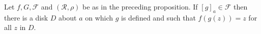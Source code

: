 Let $f, G, \mathcal{F}$ and $(\mathcal{R}, \rho)$ be as in the preceding proposition. If $[g]_a \in \mathcal{F}$ then there is a disk $D$ about $a$ on which $g$ is defined and such that $f(g(z)) = z$ for all $z$ in $D$.